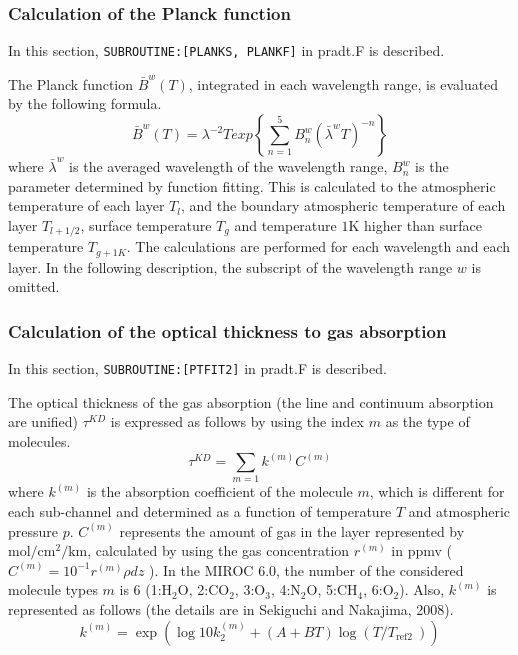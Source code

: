 \hypertarget{calculation-of-the-planck-function}{%
\subsubsection{Calculation of the Planck
function}\label{calculation-of-the-planck-function}}

In this section, \texttt{SUBROUTINE:{[}PLANKS,\ PLANKF{]}} in pradt.F is
described.

The Planck function \(\bar{B}^{w}(T)\), integrated in each wavelength
range, is evaluated by the following formula. \begin{equation}
\bar{B}^{w}(T)=\lambda^{-2}{Texp}\left\{\sum_{n=1}^{5} B_{n}^{w}\left(\bar{\lambda}^{w} T\right)^{-n}\right\}
\end{equation} where \(\bar{\lambda}^{w}\) is the averaged wavelength of the
wavelength range, \(B_{n}^{w}\) is the parameter determined by function
fitting. This is calculated to the atmospheric temperature of each layer
\(T_l\), and the boundary atmospheric temperature of each layer
\(T_{l+1/2}\), surface temperature \(T_g\) and temperature
\(1\mathrm{K}\) higher than surface temperature \(T_{g+1K}\). The
calculations are performed for each wavelength and each layer. In the
following description, the subscript of the wavelength range \(w\) is
omitted.

\hypertarget{calculation-of-the-optical-thickness-to-gas-absorption}{%
\subsubsection{Calculation of the optical thickness to gas
absorption}\label{calculation-of-the-optical-thickness-to-gas-absorption}}

In this section, \texttt{SUBROUTINE:{[}PTFIT2{]}} in pradt.F is
described.

The optical thickness of the gas absorption (the line and continuum
absorption are unified) \(\tau^{K D}\) is expressed as follows by using
the index \(m\) as the type of molecules. \begin{equation}
\tau^{KD}=\sum_{m=1} k^{(m)} C^{(m)}
\end{equation} where \(k^{(m)}\) is the absorption coefficient of the molecule
\(m\), which is different for each sub-channel and determined as a
function of temperature \(T\) and atmospheric pressure \(p\).
\(C^{(m)}\) represents the amount of gas in the layer represented by
\(\mathrm{mol} / \mathrm{cm}^{2} / \mathrm{km}\), calculated by using
the gas concentration \(r^{(m)}\) in ppmv (
\(C^{(m)}=10^{-1} r^{(m)} \rho d z\) ). In the MIROC 6.0, the number of
the considered molecule types \(m\) is 6
(1:\(\mathrm{H}_{2} \mathrm{O}\), 2:\(\mathrm{C}\mathrm{O}_{2}\),
3:\(\mathrm{O}_{3}\), 4:\(\mathrm{N}_{2} \mathrm{O}\),
5:\(\mathrm{C}\mathrm{H}_{4}\), 6:\(\mathrm{O}_{2}\)). Also, \(k^{(m)}\)
is represented as follows (the details are in Sekiguchi and Nakajima,
2008). \begin{equation}
k^{(m)}=\exp \left(\log 10 k_{2}^{(m)}+(A+B T) \log \left(T / T_{\text {ref2 } }\right)\right)
\end{equation}

